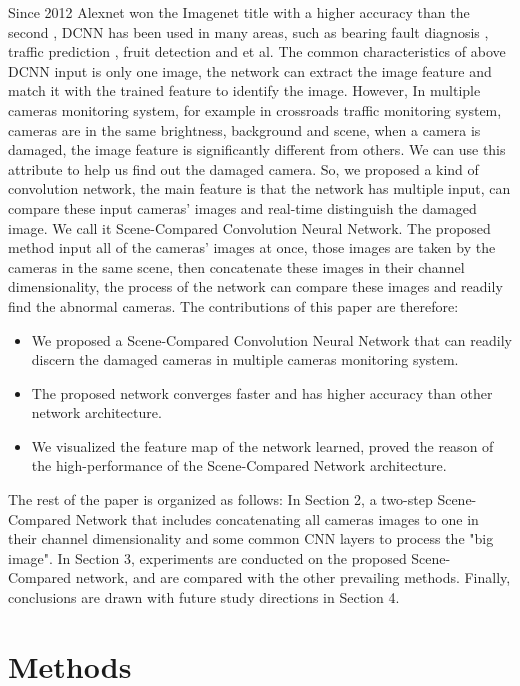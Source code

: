 \documentclass[sensors,article,submit,moreauthors,pdftex,10pt,a4paper]{mdpi}
\begin{document}
Since 2012 Alexnet won the Imagenet \cite{imagenet} title with a higher accuracy than the second \cite{AlexNet}, DCNN has been used in many areas, such as bearing fault diagnosis \cite{BearingFaultDiagnosis}, traffic prediction \cite{TrafficPrediction}, fruit detection \cite{FruitDetection} and et al. The common characteristics of above DCNN input is only one image, the network can extract the image feature and match it with the trained feature to identify the image. However, In multiple cameras monitoring system, for example in crossroads traffic monitoring system, cameras are in the same brightness, background and scene, when a camera is damaged, the image feature is significantly different from others. We can use this attribute to help us find out the damaged camera. So, we proposed a kind of convolution network, the main feature is that the network has multiple input, can compare these input cameras' images and real-time distinguish the damaged image. We call it Scene-Compared Convolution Neural Network. The proposed method input all of the cameras' images at once, those images are taken by the cameras in the same scene, then concatenate these images in their channel dimensionality, the process of the network can compare these images and readily find the abnormal cameras. The contributions of this paper are therefore:
\begin{itemize}[leftmargin=*,labelsep=5.8mm]
	\item	We proposed a Scene-Compared Convolution Neural Network that can readily discern the damaged cameras in multiple cameras monitoring system.
	\item	The proposed network converges faster and has higher accuracy than other network architecture.
	\item	We visualized the feature map of the network learned, proved the reason of the high-performance of the Scene-Compared Network architecture.
\end{itemize}

The rest of the paper is organized as follows: In Section 2, a two-step Scene-Compared Network that includes concatenating all cameras images to one in their channel dimensionality and some common CNN layers to process the "big image". In Section 3, experiments are conducted on the proposed Scene-Compared network, and are compared with the other prevailing methods. Finally, conclusions are drawn with future study directions in Section 4. 

\section{Methods}
\end{document}
